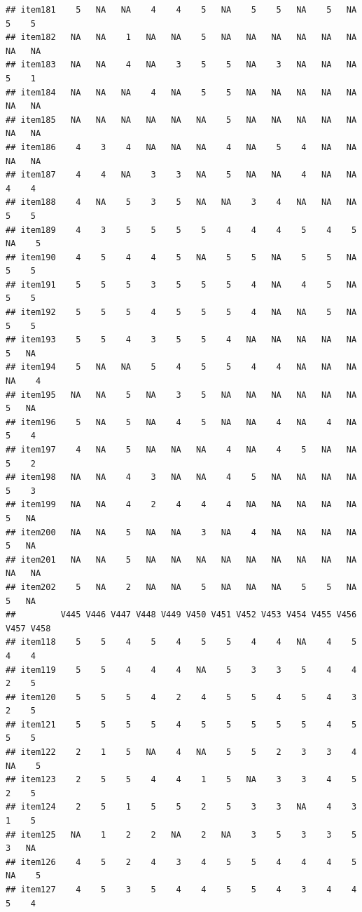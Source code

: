 \documentclass[
  man]{apa6}
\begin{document}
\begin{verbatim}
## item181    5   NA   NA    4    4    5   NA    5    5   NA    5   NA    5    5
## item182   NA   NA    1   NA   NA    5   NA   NA   NA   NA   NA   NA   NA   NA
## item183   NA   NA    4   NA    3    5    5   NA    3   NA   NA   NA    5    1
## item184   NA   NA   NA    4   NA    5    5   NA   NA   NA   NA   NA   NA   NA
## item185   NA   NA   NA   NA   NA   NA    5   NA   NA   NA   NA   NA   NA   NA
## item186    4    3    4   NA   NA   NA    4   NA    5    4   NA   NA   NA   NA
## item187    4    4   NA    3    3   NA    5   NA   NA    4   NA   NA    4    4
## item188    4   NA    5    3    5   NA   NA    3    4   NA   NA   NA    5    5
## item189    4    3    5    5    5    5    4    4    4    5    4    5   NA    5
## item190    4    5    4    4    5   NA    5    5   NA    5    5   NA    5    5
## item191    5    5    5    3    5    5    5    4   NA    4    5   NA    5    5
## item192    5    5    5    4    5    5    5    4   NA   NA    5   NA    5    5
## item193    5    5    4    3    5    5    4   NA   NA   NA   NA   NA    5   NA
## item194    5   NA   NA    5    4    5    5    4    4   NA   NA   NA   NA    4
## item195   NA   NA    5   NA    3    5   NA   NA   NA   NA   NA   NA    5   NA
## item196    5   NA    5   NA    4    5   NA   NA    4   NA    4   NA    5    4
## item197    4   NA    5   NA   NA   NA    4   NA    4    5   NA   NA    5    2
## item198   NA   NA    4    3   NA   NA    4    5   NA   NA   NA   NA    5    3
## item199   NA   NA    4    2    4    4    4   NA   NA   NA   NA   NA    5   NA
## item200   NA   NA    5   NA   NA    3   NA    4   NA   NA   NA   NA    5   NA
## item201   NA   NA    5   NA   NA   NA   NA   NA   NA   NA   NA   NA   NA   NA
## item202    5   NA    2   NA   NA    5   NA   NA   NA    5    5   NA    5   NA
##         V445 V446 V447 V448 V449 V450 V451 V452 V453 V454 V455 V456 V457 V458
## item118    5    5    4    5    4    5    5    4    4   NA    4    5    4    4
## item119    5    5    4    4    4   NA    5    3    3    5    4    4    2    5
## item120    5    5    5    4    2    4    5    5    4    5    4    3    2    5
## item121    5    5    5    5    4    5    5    5    5    5    4    5    5    5
## item122    2    1    5   NA    4   NA    5    5    2    3    3    4   NA    5
## item123    2    5    5    4    4    1    5   NA    3    3    4    5    2    5
## item124    2    5    1    5    5    2    5    3    3   NA    4    3    1    5
## item125   NA    1    2    2   NA    2   NA    3    5    3    3    5    3   NA
## item126    4    5    2    4    3    4    5    5    4    4    4    5   NA    5
## item127    4    5    3    5    4    4    5    5    4    3    4    4    5    4

\end{verbatim}
\end{document}
